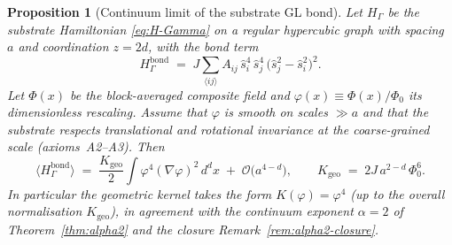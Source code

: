 \documentclass[11pt,a4paper]{article}
\renewcommand{\Phi}{\varPhi}
\newtheorem{proposition}[axiom]{Proposition}
\begin{document}
\begin{proposition}[Continuum limit of the substrate GL bond]
\label{prop:substrate-action}
Let \(H_{\Gamma}\) be the substrate Hamiltonian \eqref{eq:H-Gamma} on a
regular hypercubic graph with spacing \(a\) and coordination \(z=2d\),
with the bond term
\begin{equation}\label{eq:H-bond-app}
  H_{\Gamma}^{\mathrm{bond}}
  \;=\;J\!\!\sum_{\langle ij\rangle}\!A_{ij}\,
       \hat{s}_{i}^{4}\,\hat{s}_{j}^{4}\,
       \bigl(\hat{s}_{j}^{2}-\hat{s}_{i}^{2}\bigr)^{2}.
\end{equation}
Let \(\Phi(x)\) be the block-averaged composite field and
\(\varphi(x)\equiv\Phi(x)/\Phi_{0}\) its dimensionless rescaling.
Assume that \(\varphi\) is smooth on scales \(\gg a\) and that the
substrate respects translational and rotational invariance at the
coarse-grained scale (axioms~A2--A3). Then
\begin{equation}\label{eq:bond-continuum}
  \bigl\langle H_{\Gamma}^{\mathrm{bond}}\bigr\rangle
  \;=\;\frac{K_{\mathrm{geo}}}{2}
     \int\!\varphi^{4}(\nabla\varphi)^{2}\,d^{d}x
     \;+\;\mathcal{O}\!\bigl(a^{4-d}\bigr),
  \qquad
  K_{\mathrm{geo}}\;=\;2J\,a^{2-d}\,\Phi_{0}^{6}.
\end{equation}
In particular the geometric kernel takes the form
\(K(\varphi)=\varphi^{4}\) (up to the overall normalisation
\(K_{\mathrm{geo}}\)), in agreement with the continuum exponent
\(\alpha=2\) of Theorem~\ref{thm:alpha2} and the closure
Remark~\ref{rem:alpha2-closure}.
\end{proposition}
\end{document}
